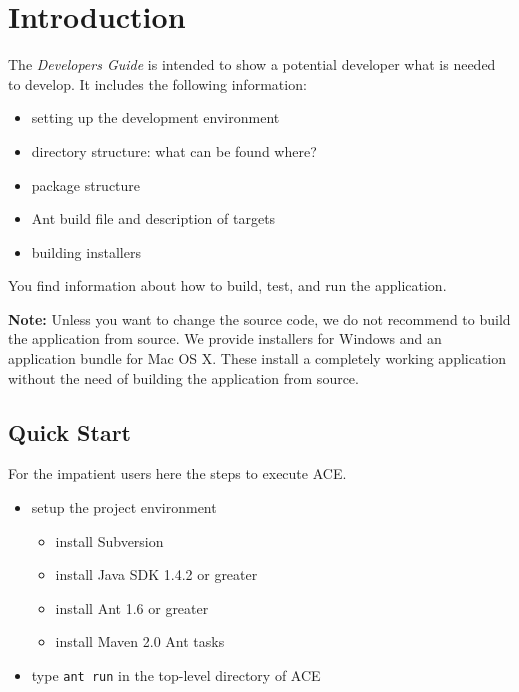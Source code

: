 \documentclass[11pt,a4paper]{article}
\begin{document}
\setlength{\parindent}{0pt}
\setlength{\parskip}{0pt}



\tableofcontents
\newpage


\section{Introduction}
The \emph{Developers Guide} is intended to show a potential developer what
is needed to develop. It includes the following information:

\begin{itemize}
 \item setting up the development environment
 \item directory structure: what can be found where?
 \item package structure
 \item Ant build file and description of targets
 \item building installers
\end{itemize} 

You find information about how to build, test, and run the application.

\textbf{Note:} Unless you want to change the source code, we do not recommend 
to build the
application from source. We provide installers for Windows and an
application bundle for Mac OS X. These install a completely working
application without the need of building the application from source.


\subsection{Quick Start}
For the impatient users here the steps to execute ACE.

\begin{itemize}
 \item setup the project environment
 \begin{itemize}
  \item install Subversion
  \item install Java SDK 1.4.2 or greater
  \item install Ant 1.6 or greater
  \item install Maven 2.0 Ant tasks
 \end{itemize}
 \item type \texttt{ant run} in the top-level directory of ACE
\end{itemize}
\end{document}
